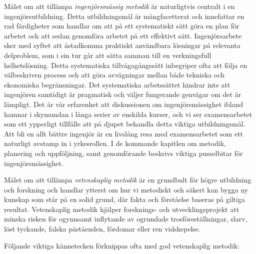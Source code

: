 Målet om att tillämpa \emph{ingenjörsmässig metodik} är naturligtvis
centralt i en ingenjörsutbildning. Detta utbildningsmål är
mångfacetterat och innefattar en rad färdigheter som handlar om att på
ett systematiskt sätt göra en plan för arbetet och att sedan genomföra
arbetet på ett effektivt sätt. Ingenjörsarbete sker med syftet att
åstadkomma praktiskt användbara lösningar på relevanta delproblem, som i
sin tur går att sätta samman till en verkningsfull helhetslösning. Detta
systematiska tillvägagångssätt inbegriper ofta att följa en välbeskriven
process och att göra avvägningar mellan både tekniska och ekonomiska
begränsningar. Det systematiska arbetssättet hindrar inte att ingenjören
samtidigt är pragmatisk och väljer fungerande genvägar om det är
lämpligt. Det är vår erfarenhet att diskussionen om ingenjörsmässighet
ibland hamnar i skymundan i långa serier av enskilda kurser, och vi ser
examensarbetet som ett ypperligt tillfälle att på djupet behandla detta
viktiga utbildningsmål. Att bli en allt bättre ingenjör är en livslång
resa med examensarbetet som ett naturligt avstamp in i yrkesrollen. I de
kommande kapitlen om metodik, planering och uppföljning, samt
genomförande beskrivs viktiga pusselbitar för ingenjörsmässighet.

Målet om att tillämpa \emph{vetenskaplig metodik} är en grundbult för
högre utbildning och forskning och handlar ytterst om hur vi metodiskt
och säkert kan bygga ny kunskap som står på en solid grund, där fakta
och förståelse baseras på giltiga resultat. Vetenskaplig metodik hjälper
forsknings- och utvecklingsprojekt att minska risken för ogynnsamt
inflytande av ogrundade trosföreställningar, slarv, löst tyckande,
falska påståenden, fördomar eller ren vidskepelse.

Följande viktiga kännetecken förknippas ofta med god vetenskaplig
metodik:

